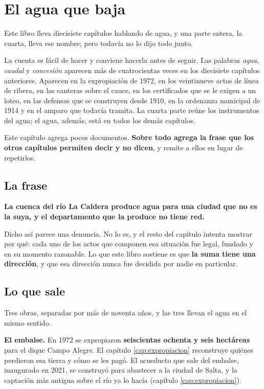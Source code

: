 \chapter{El agua que baja}
\label{cap:aguabaja}

Este libro lleva diecisiete capítulos hablando de agua, y una parte entera, la cuarta, lleva ese nombre; pero todavía no lo dijo todo junto.

La cuenta es fácil de hacer y conviene hacerla antes de seguir. Las palabras \textit{agua},
\textit{caudal} y \textit{concesión} aparecen más de cuatrocientas veces en los diecisiete
capítulos anteriores. Aparecen en la expropiación de 1972, en los veintinueve actos de línea de ribera, en las canteras sobre el cauce, en los certificados que se le exigen a un loteo, en las
defensas que se construyen desde 1910, en la ordenanza municipal de 1914 y en el amparo que
todavía tramita. La cuarta parte reúne los instrumentos del agua; el agua, además, está en todos los demás capítulos.

Este capítulo agrega pocos documentos. \textbf{Sobre todo agrega la frase que los otros capítulos permiten
decir y no dicen}, y remite a ellos en lugar de repetirlos.

\section{La frase}

\textbf{La cuenca del río La Caldera produce agua para una ciudad que no es la suya, y el
departamento que la produce no tiene red.}

Dicho así parece una denuncia. No lo es, y el resto del capítulo intenta mostrar por qué: cada
uno de los actos que componen esa situación fue legal, fundado y en su momento razonable. Lo
que este libro sostiene es que \textbf{la suma tiene una dirección}, y que esa dirección nunca
fue decidida por nadie en particular.

\section{Lo que sale}

Tres obras, separadas por más de noventa años, y las tres llevan el agua en el mismo sentido.

\textbf{El embalse.} En 1972 se expropiaron \textbf{seiscientas ochenta y seis hectáreas} para
el dique Campo Alegre. El capítulo \ref{cap:expropiacion} reconstruye quiénes perdieron esa
tierra y cómo se les pagó. El acueducto que sale del embalse, inaugurado en 2021, se construyó para abastecer a la ciudad de Salta, y la captación más antigua sobre el río ya lo hacía (capítulo \ref{cap:expropiacion}).


